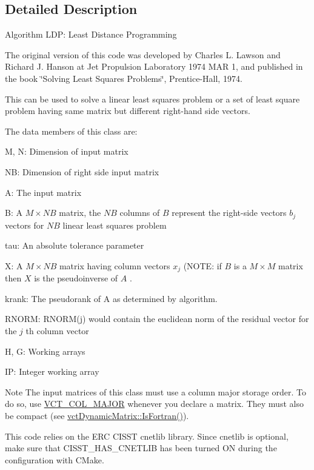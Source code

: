 \subsection{Detailed Description}
Algorithm L\-D\-P\-: Least Distance Programming

The original version of this code was developed by Charles L. Lawson and Richard J. Hanson at Jet Propulsion Laboratory 1974 M\-A\-R 1, and published in the book \char`\"{}\-Solving Least Squares Problems\char`\"{}, Prentice-\/\-Hall, 1974.

This can be used to solve a linear least squares problem or a set of least square problem having same matrix but different right-\/hand side vectors.

The data members of this class are\-:
\begin{DoxyItemize}
\item M, N\-: Dimension of input matrix
\item N\-B\-: Dimension of right side input matrix
\item A\-: The input matrix
\item B\-: A $ M \times NB $ matrix, the $ NB $ columns of $ B $ represent the right-\/side vectors $ b_j $ vectors for $ NB $ linear least squares problem
\item tau\-: An absolute tolerance parameter
\item X\-: A $ M \times NB $ matrix having column vectors $ x_j $ (N\-O\-T\-E\-: if $ B $ is a $ M \times M $ matrix then $ X $ is the pseudoinverse of $ A $ .
\item krank\-: The pseudorank of A as determined by algorithm.
\item R\-N\-O\-R\-M\-: R\-N\-O\-R\-M(j) would contain the euclidean norm of the residual vector for the $ j $ th column vector
\item H, G\-: Working arrays
\item I\-P\-: Integer working array
\end{DoxyItemize}

\begin{DoxyNote}{Note}
The input matrices of this class must use a column major storage order. To do so, use \hyperlink{vct_forward_declarations_8h_a432cdf8923afaf82f551450ad4034746}{V\-C\-T\-\_\-\-C\-O\-L\-\_\-\-M\-A\-J\-O\-R} whenever you declare a matrix. They must also be compact (see \hyperlink{classvct_dynamic_const_matrix_base_aac5f19015b4888f760f99daa4bac199c}{vct\-Dynamic\-Matrix\-::\-Is\-Fortran()}).

This code relies on the E\-R\-C C\-I\-S\-S\-T cnetlib library. Since cnetlib is optional, make sure that C\-I\-S\-S\-T\-\_\-\-H\-A\-S\-\_\-\-C\-N\-E\-T\-L\-I\-B has been turned O\-N during the configuration with C\-Make. 
\end{DoxyNote}


